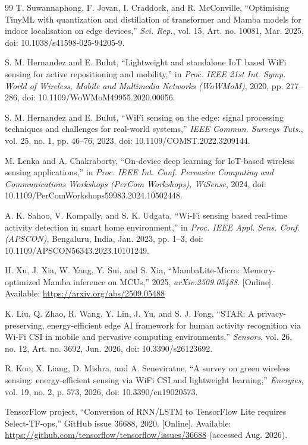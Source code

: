 \documentclass{ieeeaccess}
\begin{document}
\begin{thebibliography}{99}
T. Suwannaphong, F. Jovan, I. Craddock, and R. McConville, ``Optimising TinyML with quantization and distillation of transformer and Mamba models for indoor localisation on edge devices,'' \emph{Sci. Rep.}, vol. 15, Art. no. 10081, Mar. 2025, doi: 10.1038/s41598-025-94205-9.

S. M. Hernandez and E. Bulut, ``Lightweight and standalone IoT based WiFi sensing for active repositioning and mobility,'' in \emph{Proc. IEEE 21st Int. Symp. World of Wireless, Mobile and Multimedia Networks (WoWMoM)}, 2020, pp. 277--286, doi: 10.1109/WoWMoM49955.2020.00056.

S. M. Hernandez and E. Bulut, ``WiFi sensing on the edge: signal processing techniques and challenges for real-world systems,'' \emph{IEEE Commun. Surveys Tuts.}, vol. 25, no. 1, pp. 46--76, 2023, doi: 10.1109/COMST.2022.3209144.

M. Lenka and A. Chakraborty, ``On-device deep learning for IoT-based wireless sensing applications,'' in \emph{Proc. IEEE Int. Conf. Pervasive Computing and Communications Workshops (PerCom Workshops), WiSense}, 2024, doi: 10.1109/PerComWorkshops59983.2024.10502448.

A. K. Sahoo, V. Kompally, and S. K. Udgata, ``Wi-Fi sensing based real-time activity detection in smart home environment,'' in \emph{Proc. IEEE Appl. Sens. Conf. (APSCON)}, Bengaluru, India, Jan. 2023, pp. 1--3, doi: 10.1109/APSCON56343.2023.10101249.

H. Xu, J. Xia, W. Yang, Y. Sui, and S. Xia, ``MambaLite-Micro: Memory-optimized Mamba inference on MCUs,'' 2025, \emph{arXiv:2509.05488}. [Online]. Available: \url{https://arxiv.org/abs/2509.05488}

K. Liu, Q. Zhao, R. Wang, Y. Lin, J. Yu, and S. J. Fong, ``STAR: A privacy-preserving, energy-efficient edge AI framework for human activity recognition via Wi-Fi CSI in mobile and pervasive computing environments,'' \emph{Sensors}, vol. 26, no. 12, Art. no. 3692, Jun. 2026, doi: 10.3390/s26123692.

R. Koo, X. Liang, D. Mishra, and A. Seneviratne, ``A survey on green wireless sensing: energy-efficient sensing via WiFi CSI and lightweight learning,'' \emph{Energies}, vol. 19, no. 2, p. 573, 2026, doi: 10.3390/en19020573.

TensorFlow project, ``Conversion of RNN/LSTM to TensorFlow Lite requires Select-TF-ops,'' GitHub issue 36688, 2020. [Online]. Available: \url{https://github.com/tensorflow/tensorflow/issues/36688} (accessed Aug. 2026).


\end{thebibliography}
\end{document}
